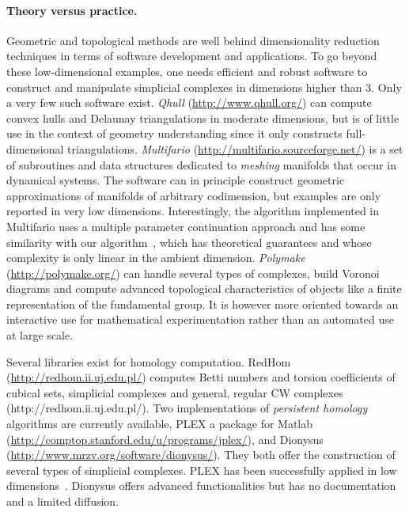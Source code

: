 \paragraph{Theory versus practice.} 
Geometric and topological methods are well behind dimensionality reduction techniques in terms of 
software development and applications.  
%
%
To go beyond these low-dimensional examples, one needs efficient and robust software to construct and manipulate simplicial complexes in dimensions higher than 3.  Only a very few such software exist.  {\em Qhull} (\url{http://www.qhull.org/}{}) can compute convex hulls and Delaunay triangulations in moderate dimensions, but is of little use in the context of geometry understanding since it only constructs full-dimensional triangulations. {\em Multifario} (\url{http://multifario.sourceforge.net/}{}) is a set of subroutines and data structures dedicated to {\em meshing} manifolds that occur in dynamical systems. The software can in principle construct geometric approximations of manifolds of arbitrary codimension, but examples are only reported in very low dimensions. Interestingly, the algorithm implemented in Multifario  uses a multiple parameter continuation approach and has some similarity with our algorithm~\cite{boissonnat2010meshing}, which has theoretical guarantees and whose complexity is only linear in the ambient dimension.  {\em Polymake} (\url{http://polymake.org/}{}) can handle several types of complexes, build Voronoi diagrams and compute advanced topological characteristics of objects like a finite representation of the fundamental group. It is however more oriented towards an interactive use for mathematical experimentation
rather than  an automated use at large scale.%

Several libraries exist for homology computation. RedHom (\url{http://redhom.ii.uj.edu.pl/}{}) computes Betti numbers and torsion coefficients of cubical sets, simplicial complexes and general, regular CW complexes (http://redhom.ii.uj.edu.pl/).
Two implementations of {\em persistent homology} algorithms are currently available, PLEX a package for Matlab (\url{http://comptop.stanford.edu/u/programs/jplex/}{}), and  Dionysus (\url{http://www.mrzv.org/software/dionysus/}{}). They both offer the construction of several types of simplicial complexes. PLEX has been  successfully applied in low dimensions~\cite{fpgo-airc-2009,rg-bptd-2008}. Dionysus offers advanced
functionalities but has no documentation and a limited diffusion.
\vspace{2mm}

